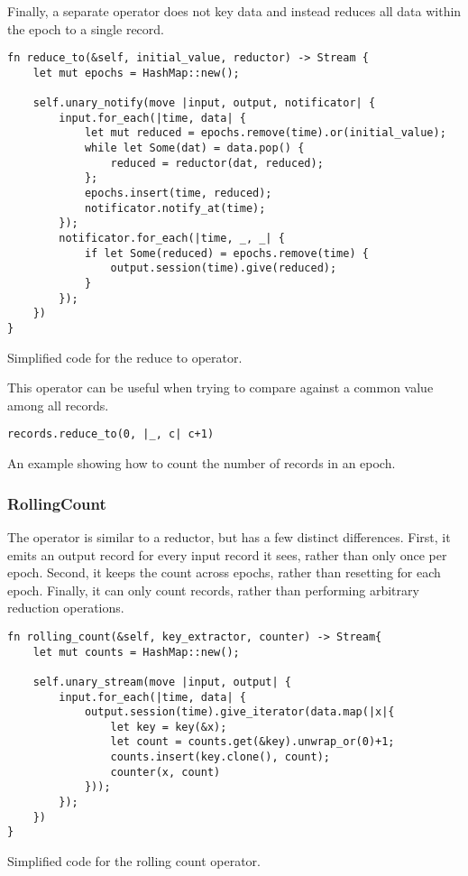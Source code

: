 Finally, a separate  operator does not key data and instead reduces all data within the epoch to a single record.

\begin{listing}[H]
\begin{verbatim}
fn reduce_to(&self, initial_value, reductor) -> Stream {
    let mut epochs = HashMap::new();
    
    self.unary_notify(move |input, output, notificator| {
        input.for_each(|time, data| {
            let mut reduced = epochs.remove(time).or(initial_value);
            while let Some(dat) = data.pop() {
                reduced = reductor(dat, reduced);
            };
            epochs.insert(time, reduced);
            notificator.notify_at(time);
        });
        notificator.for_each(|time, _, _| {
            if let Some(reduced) = epochs.remove(time) {
                output.session(time).give(reduced);
            }
        });
    })
}
\end{verbatim}
  \caption{Simplified code for the reduce to operator.}
  \label{lst:reduce-to}
\end{listing}

This operator can be useful when trying to compare against a common value among all records.

\begin{listing}[H]
\begin{verbatim}
records.reduce_to(0, |_, c| c+1)
\end{verbatim}
\caption{An example showing how to count the number of records in an epoch.}
\label{lst:reduce-to-example}
\end{listing}

\subsubsection{RollingCount}
The  operator is similar to a reductor, but has a few distinct differences. First, it emits an output record for every input record it sees, rather than only once per epoch. Second, it keeps the count across epochs, rather than resetting for each epoch. Finally, it can only count records, rather than performing arbitrary reduction operations.

\begin{listing}[H]
\begin{verbatim}
fn rolling_count(&self, key_extractor, counter) -> Stream{
    let mut counts = HashMap::new();
    
    self.unary_stream(move |input, output| {
        input.for_each(|time, data| {
            output.session(time).give_iterator(data.map(|x|{
                let key = key(&x);
                let count = counts.get(&key).unwrap_or(0)+1;
                counts.insert(key.clone(), count);
                counter(x, count)
            }));
        });
    })
}
\end{verbatim}
  \caption{Simplified code for the rolling count operator.}
  \label{lst:rolling-count}
\end{listing}

